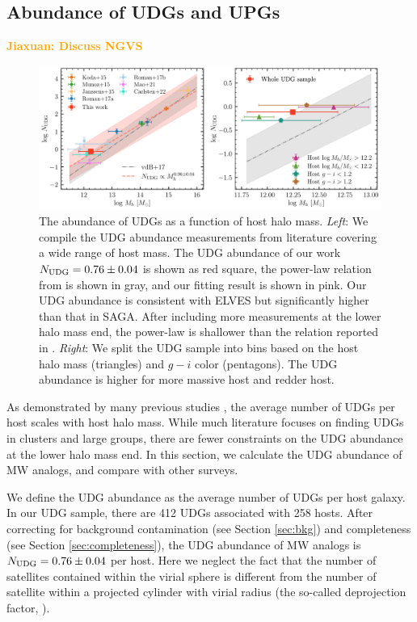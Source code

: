 \documentclass[twocolumn,astrosymb,twocolappendix]{aastex631}
\newcommand{\jiaxuan}[1]{\textcolor{orange}{\textbf{Jiaxuan: #1}}}
\begin{document}
\begin{CJK*}{UTF8}{gbsn}
\subsection{Abundance of UDGs and UPGs}\label{sec:n_udg}
\jiaxuan{Discuss NGVS}
\begin{figure}
	\vbox{ 
		\centering
		\includegraphics[width=1\linewidth]{N_UDG_host_mass.pdf}
	}
    \caption{The abundance of UDGs as a function of host halo mass. \textit{Left}: We compile the UDG abundance measurements from literature covering a wide range of host mass. The UDG abundance of our work $N_{\rm UDG} = 0.76\pm 0.04$ is shown as red square, the power-law relation from \citet{vdBurg2017} is shown in gray, and our fitting result is shown in pink. Our UDG abundance is consistent with ELVES but significantly higher than that in SAGA. After including more measurements at the lower halo mass end, the power-law is shallower than the relation reported in \citet{vdBurg2017}. \textit{Right}: We split the UDG sample into bins based on the host halo mass (triangles) and $g-i$ color (pentagons). The UDG abundance is higher for more massive host and redder host. }
    \label{fig:n_udg}
\end{figure}

As demonstrated by many previous studies \citep[e.g.,][]{vdBurg2016,vdBurg2017}, the average number of UDGs per host scales with host halo mass. While much literature focuses on finding UDGs in clusters and large groups, there are fewer constraints on the UDG abundance at the lower halo mass end. In this section, we calculate the UDG abundance of MW analogs, and compare with other surveys.

We define the UDG abundance as the average number of UDGs per host galaxy. In our UDG sample, there are 412 UDGs associated with 258 hosts. After correcting for background contamination (see Section \ref{sec:bkg}) and completeness (see Section \ref{sec:completeness}), the UDG abundance of MW analogs is $N_{\rm UDG} = 0.76\pm 0.04$ per host. Here we neglect the fact that the number of satellites contained within the virial sphere is different from the number of satellite within a projected cylinder with virial radius (the so-called deprojection factor, \citealt{vdBurg2017}).


\end{CJK*}
\end{document}

